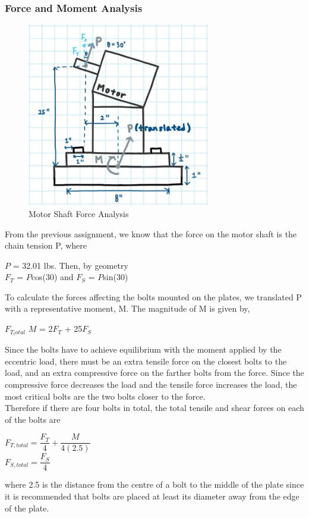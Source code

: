 \documentclass[letterpaper,12pt]{article}
\begin{document}
\subsubsection{Force and Moment Analysis}
\begin{figure}[h]
    \centering
    \includegraphics[width=8cm]{BoltForces.jpg}
    \caption{Motor Shaft Force Analysis}
\end{figure}
From the previous assignment, we know that the force on the motor shaft is the chain tension P, where
\begin{center}
    $P$ = 32.01 lbs. Then, by geometry\\
    $F_{T}$ = $P$cos(30) and $F_{S}$ = $P$sin(30)
\end{center}
To calculate the forces affecting the bolts mounted on the plates, we translated P with a representative moment, M.
The magnitude of M is given by,
\begin{center}
 $F_{T_total}$ 
    $M$ = 2$F_{T}$ + 25$F_{S}$
\end{center}

\noindent Since the bolts have to achieve equilibrium with the moment applied by the eccentric load, there must be an extra tensile force on the closest bolts to the load, and an extra compressive force on the farther bolts from the force. Since the compressive force decreases the load and the tensile force increases the load, the most critical bolts are the two bolts closer to the force.\\
\noindent Therefore if there are four bolts in total, the total tensile and shear forces on each of the bolts are
\begin{center}
   $F_{T,total} = \dfrac{F_{T}}{4} + \dfrac{M}{4(2.5)}$\\
   $F_{S,total} = \dfrac{F_{S}}{4}$
\end{center}
where 2.5 is the distance from the centre of a bolt to the middle of the plate since it is recommended that bolts are placed at least its diameter away from the edge of the plate. 
\end{document}
